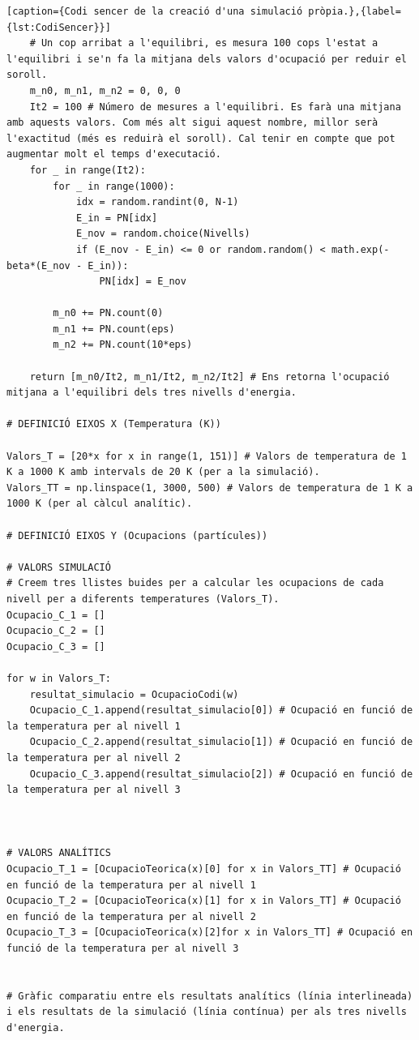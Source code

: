 \documentclass[a4paper,10.5pt]{report}
\begin{document}
\begin{appendices}
\begin{lstlisting}[caption={Codi sencer de la creació d'una simulació pròpia.},{label={lst:CodiSencer}}]
	# Un cop arribat a l'equilibri, es mesura 100 cops l'estat a l'equilibri i se'n fa la mitjana dels valors d'ocupació per reduir el soroll. 
	m_n0, m_n1, m_n2 = 0, 0, 0
	It2 = 100 # Número de mesures a l'equilibri. Es farà una mitjana amb aquests valors. Com més alt sigui aquest nombre, millor serà l'exactitud (més es reduirà el soroll). Cal tenir en compte que pot augmentar molt el temps d'executació.
	for _ in range(It2):
		for _ in range(1000):
			idx = random.randint(0, N-1)
			E_in = PN[idx]
			E_nov = random.choice(Nivells)
			if (E_nov - E_in) <= 0 or random.random() < math.exp(-beta*(E_nov - E_in)):
				PN[idx] = E_nov
		
		m_n0 += PN.count(0)
		m_n1 += PN.count(eps)
		m_n2 += PN.count(10*eps)
	
	return [m_n0/It2, m_n1/It2, m_n2/It2] # Ens retorna l'ocupació mitjana a l'equilibri dels tres nivells d'energia. 

# DEFINICIÓ EIXOS X (Temperatura (K))

Valors_T = [20*x for x in range(1, 151)] # Valors de temperatura de 1 K a 1000 K amb intervals de 20 K (per a la simulació).
Valors_TT = np.linspace(1, 3000, 500) # Valors de temperatura de 1 K a 1000 K (per al càlcul analític).

# DEFINICIÓ EIXOS Y (Ocupacions (partícules))

# VALORS SIMULACIÓ
# Creem tres llistes buides per a calcular les ocupacions de cada nivell per a diferents temperatures (Valors_T).
Ocupacio_C_1 = [] 
Ocupacio_C_2 = [] 
Ocupacio_C_3 = [] 

for w in Valors_T:
	resultat_simulacio = OcupacioCodi(w)
	Ocupacio_C_1.append(resultat_simulacio[0]) # Ocupació en funció de la temperatura per al nivell 1 
	Ocupacio_C_2.append(resultat_simulacio[1]) # Ocupació en funció de la temperatura per al nivell 2
	Ocupacio_C_3.append(resultat_simulacio[2]) # Ocupació en funció de la temperatura per al nivell 3



# VALORS ANALÍTICS 
Ocupacio_T_1 = [OcupacioTeorica(x)[0] for x in Valors_TT] # Ocupació en funció de la temperatura per al nivell 1
Ocupacio_T_2 = [OcupacioTeorica(x)[1] for x in Valors_TT] # Ocupació en funció de la temperatura per al nivell 2
Ocupacio_T_3 = [OcupacioTeorica(x)[2]for x in Valors_TT] # Ocupació en funció de la temperatura per al nivell 3


# Gràfic comparatiu entre els resultats analítics (línia interlineada) i els resultats de la simulació (línia contínua) per als tres nivells d'energia. 


\end{lstlisting}
\end{appendices}
\end{document}
